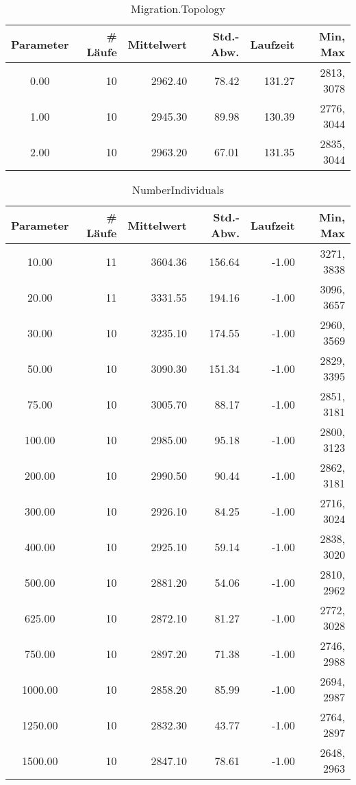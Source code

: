 \begin{table}[tbp]
\begin{tabular}{ | c || r | r | r | r | r | }
\hline
Parameter & \# Läufe & Mittelwert & Std.-Abw. & Laufzeit & Min, Max \\
\hline
   0.00 &  10 & 2962.40 &   78.42 &  131.27 & 2813, 3078 \\
   1.00 &  10 & 2945.30 &   89.98 &  130.39 & 2776, 3044 \\
   2.00 &  10 & 2963.20 &   67.01 &  131.35 & 2835, 3044 \\
\hline
\end{tabular}
\caption{Migration.Topology}\label{Migration.Topology}
\end{table}


\begin{table}[tbp]
\begin{tabular}{ | c || r | r | r | r | r | }
\hline
Parameter & \# Läufe & Mittelwert & Std.-Abw. & Laufzeit & Min, Max \\
\hline
  10.00 &  11 & 3604.36 &  156.64 &   -1.00 & 3271, 3838 \\
  20.00 &  11 & 3331.55 &  194.16 &   -1.00 & 3096, 3657 \\
  30.00 &  10 & 3235.10 &  174.55 &   -1.00 & 2960, 3569 \\
  50.00 &  10 & 3090.30 &  151.34 &   -1.00 & 2829, 3395 \\
  75.00 &  10 & 3005.70 &   88.17 &   -1.00 & 2851, 3181 \\
 100.00 &  10 & 2985.00 &   95.18 &   -1.00 & 2800, 3123 \\
 200.00 &  10 & 2990.50 &   90.44 &   -1.00 & 2862, 3181 \\
 300.00 &  10 & 2926.10 &   84.25 &   -1.00 & 2716, 3024 \\
 400.00 &  10 & 2925.10 &   59.14 &   -1.00 & 2838, 3020 \\
 500.00 &  10 & 2881.20 &   54.06 &   -1.00 & 2810, 2962 \\
 625.00 &  10 & 2872.10 &   81.27 &   -1.00 & 2772, 3028 \\
 750.00 &  10 & 2897.20 &   71.38 &   -1.00 & 2746, 2988 \\
1000.00 &  10 & 2858.20 &   85.99 &   -1.00 & 2694, 2987 \\
1250.00 &  10 & 2832.30 &   43.77 &   -1.00 & 2764, 2897 \\
1500.00 &  10 & 2847.10 &   78.61 &   -1.00 & 2648, 2963 \\
\hline
\end{tabular}
\caption{NumberIndividuals}\label{NumberIndividuals}
\end{table}


